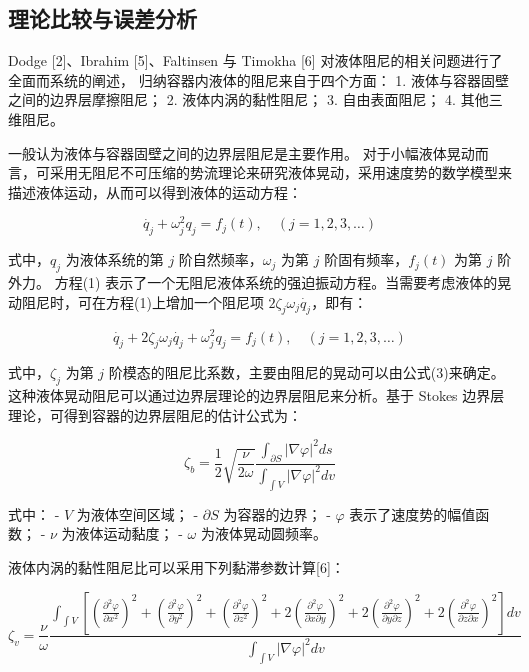 \documentclass[12pt,hyperref,a4paper,UTF8]{ctexart}
\begin{document}
        \subsection{理论比较与误差分析}
        Dodge [2]、Ibrahim [5]、Faltinsen 与 Timokha [6] 对液体阻尼的相关问题进行了全面而系统的阐述，  
        归纳容器内液体的阻尼来自于四个方面：
        1. 液体与容器固壁之间的边界层摩擦阻尼；
        2. 液体内涡的黏性阻尼；
        3. 自由表面阻尼；
        4. 其他三维阻尼。
        
        一般认为液体与容器固壁之间的边界层阻尼是主要作用。  
        对于小幅液体晃动而言，可采用无阻尼不可压缩的势流理论来研究液体晃动，采用速度势的数学模型来描述液体运动，从而可以得到液体的运动方程：
        
        \begin{equation}
        \dot{q_j} + \omega_j^2 q_j = f_j(t), \quad (j = 1, 2, 3, \dots)
        \end{equation}
        
        式中，$q_j$ 为液体系统的第 $j$ 阶自然频率，$\omega_j$ 为第 $j$ 阶固有频率，$f_j(t)$ 为第 $j$ 阶外力。  
        方程(1) 表示了一个无阻尼液体系统的强迫振动方程。当需要考虑液体的晃动阻尼时，可在方程(1)上增加一个阻尼项 $2\zeta_j\omega_j \dot{q_j}$，即有：
        
        \begin{equation}
        \dot{q_j} + 2\zeta_j\omega_j\dot{q_j} + \omega_j^2 q_j = f_j(t), \quad (j = 1, 2, 3, \dots)
        \end{equation}
        
        式中，$\zeta_j$ 为第 $j$ 阶模态的阻尼比系数，主要由阻尼的晃动可以由公式(3)来确定。  
        这种液体晃动阻尼可以通过边界层理论的边界层阻尼来分析。基于 Stokes 边界层理论，可得到容器的边界层阻尼的估计公式为：
        
        \begin{equation}
        \zeta_b = \frac{1}{2} \sqrt{\frac{\nu}{2\omega}} \frac{\int_{\partial S} |\nabla \varphi|^2 ds}{\int_{\int V} |\nabla \varphi|^2 dv}
        \end{equation}
        
        式中：
        - $V$ 为液体空间区域；
        - $\partial S$ 为容器的边界；
        - $\varphi$ 表示了速度势的幅值函数；
        - $\nu$ 为液体运动黏度；
        - $\omega$ 为液体晃动圆频率。
        
        液体内涡的黏性阻尼比可以采用下列黏滞参数计算[6]：
        
        \begin{equation}
        \zeta_v = \frac{\nu}{\omega} \frac{\int_{\int V} \left[ 
        \left(\frac{\partial^2 \varphi}{\partial x^2}\right)^2 + 
        \left(\frac{\partial^2 \varphi}{\partial y^2}\right)^2 + 
        \left(\frac{\partial^2 \varphi}{\partial z^2}\right)^2 + 
        2\left(\frac{\partial^2 \varphi}{\partial x \partial y}\right)^2 + 
        2\left(\frac{\partial^2 \varphi}{\partial y \partial z}\right)^2 + 
        2\left(\frac{\partial^2 \varphi}{\partial z \partial x}\right)^2
        \right] dv}
        {\int_{\int V} |\nabla \varphi|^2 dv}
        \end{equation}
        
\end{document}
